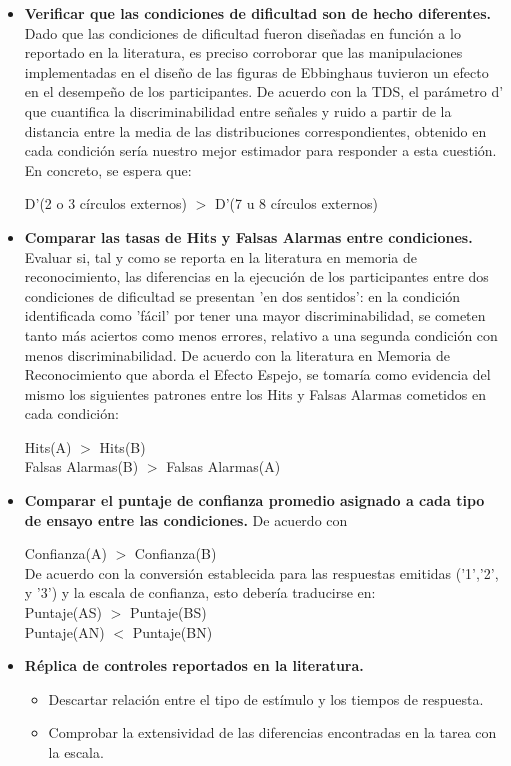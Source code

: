 \begin{itemize}
\item \textbf{Verificar que las condiciones de dificultad son de hecho diferentes.}
Dado que las condiciones de dificultad fueron diseñadas en función a lo reportado en la literatura, es preciso corroborar que las manipulaciones implementadas en el diseño de las figuras de Ebbinghaus tuvieron un efecto en el desempeño de los participantes. De acuerdo con la TDS, el parámetro d' que cuantifica la discriminabilidad entre señales y ruido a partir de la distancia entre la media de las distribuciones correspondientes, obtenido en cada condición sería nuestro mejor estimador para responder a esta cuestión. En concreto, se espera que:
\begin{center}
 D'(2 o 3 círculos externos) $>$ D'(7 u 8 círculos externos)\\
 \end{center}

 \item \textbf{Comparar las tasas de Hits y Falsas Alarmas entre condiciones.}
Evaluar si, tal y como se reporta en la literatura en memoria de reconocimiento, las diferencias en la ejecución de los participantes entre dos condiciones de dificultad se presentan 'en dos sentidos': en la condición identificada como 'fácil' por tener una mayor discriminabilidad, se cometen tanto más aciertos como menos errores, relativo a una segunda condición con menos discriminabilidad. De acuerdo con la literatura en Memoria de Reconocimiento que aborda el Efecto Espejo, se tomaría como evidencia del mismo los siguientes patrones entre los Hits y Falsas Alarmas cometidos en cada condición:
\begin{center}
Hits(A) $>$ Hits(B)\\
Falsas Alarmas(B) $>$ Falsas Alarmas(A)\\
\end{center}

\item \textbf{Comparar el puntaje de confianza promedio asignado a cada tipo de ensayo entre las condiciones.}
De acuerdo con 
\begin{center}
Confianza(A) $>$ Confianza(B)\\
De acuerdo con la conversión establecida para las respuestas emitidas ('1','2', y '3') y la escala de confianza, esto debería traducirse en:\\
Puntaje(AS) $>$ Puntaje(BS)\\
Puntaje(AN) $<$ Puntaje(BN)\\
\end{center}

\item \textbf{Réplica de controles reportados en la literatura.}
	\begin{itemize}
	\item Descartar relación entre el tipo de estímulo y los tiempos de respuesta.
	\item Comprobar la extensividad de las diferencias encontradas en la tarea con la escala.
	\end{itemize}
\end{itemize}

